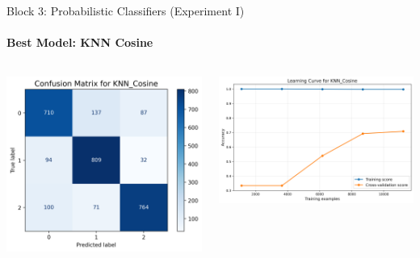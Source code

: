 \documentclass[9pt]{beamer}
\begin{document}
    \begin{frame}{Block 3: Probabilistic Classifiers (Experiment I)}
    \framesubtitle{Best Model: KNN Cosine}
    \begin{columns}
        \begin{column}{0.33\textwidth}
            \centering
            \includegraphics[width=\textwidth]{code/ResultsMainAugZip/plots/Block3_Probabilistic_Experiment_I/confusion_matrix_KNN_Cosine.png}
        \end{column}
        \begin{column}{0.33\textwidth}
            \centering
            \includegraphics[width=\textwidth]{code/ResultsMainAugZip/plots/Block3_Probabilistic_Experiment_I/learning_curve_KNN_Cosine.png}

\end{column}
\end{columns}
\end{frame}
\end{document}
